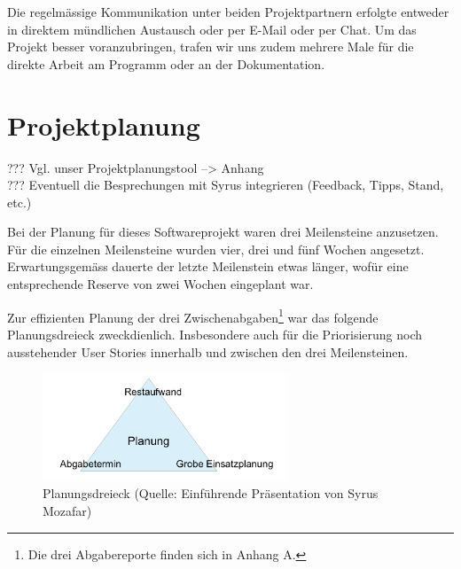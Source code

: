 Die regelmässige Kommunikation unter beiden Projektpartnern erfolgte entweder in direktem mündlichen Austausch oder per E-Mail oder per Chat. Um das Projekt besser voranzubringen, trafen wir uns zudem mehrere Male für die direkte Arbeit am Programm oder an der Dokumentation.



\section{Projektplanung}



??? Vgl. unser Projektplanungstool --> Anhang \\

??? Eventuell die Besprechungen mit Syrus integrieren (Feedback, Tipps, Stand, etc.) \\



\vspace*{1cm}



Bei der Planung für dieses Softwareprojekt waren drei Meilensteine anzusetzen. Für die einzelnen Meilensteine wurden vier, drei und fünf Wochen angesetzt. Erwartungsgemäss dauerte der letzte Meilenstein etwas länger, wofür eine entsprechende Reserve von zwei Wochen eingeplant war.

Zur effizienten Planung der drei Zwischenabgaben\footnote{Die drei Abgabereporte finden sich in Anhang A.} war das folgende Planungsdreieck zweckdienlich. Insbesondere auch für die Priorisierung noch ausstehender User Stories innerhalb und zwischen den drei Meilensteinen. \\


\begin{figure}[h]
  \centering
	\includegraphics [width=0.65\textwidth]{images/Planungsdreieck_Quelle.png} 
	\caption{Planungsdreieck (Quelle: Einführende Präsentation von Syrus Mozafar)}
\end{figure}


\vspace*{0.5cm}

